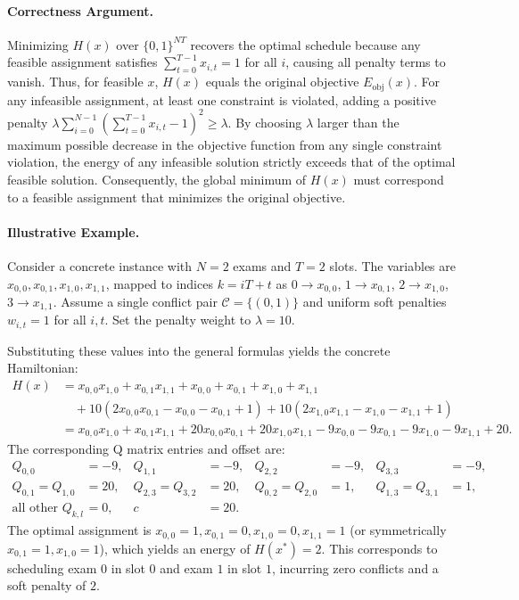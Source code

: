 \documentclass[12pt]{article}
\begin{document}
\paragraph{Correctness Argument.}
Minimizing $H(x)$ over $\{0,1\}^{NT}$ recovers the optimal schedule because any feasible assignment satisfies $\sum_{t=0}^{T-1} x_{i,t} = 1$ for all $i$, causing all penalty terms to vanish. Thus, for feasible $x$, $H(x)$ equals the original objective $E_{\text{obj}}(x)$. For any infeasible assignment, at least one constraint is violated, adding a positive penalty $\lambda \sum_{i=0}^{N-1} (\sum_{t=0}^{T-1} x_{i,t} - 1)^2 \ge \lambda$. By choosing $\lambda$ larger than the maximum possible decrease in the objective function from any single constraint violation, the energy of any infeasible solution strictly exceeds that of the optimal feasible solution. Consequently, the global minimum of $H(x)$ must correspond to a feasible assignment that minimizes the original objective.

\paragraph{Illustrative Example.}
Consider a concrete instance with $N=2$ exams and $T=2$ slots. The variables are $x_{0,0}, x_{0,1}, x_{1,0}, x_{1,1}$, mapped to indices $k = i T + t$ as $0 \to x_{0,0}$, $1 \to x_{0,1}$, $2 \to x_{1,0}$, $3 \to x_{1,1}$. Assume a single conflict pair $\mathcal{C} = \{(0,1)\}$ and uniform soft penalties $w_{i,t} = 1$ for all $i,t$. Set the penalty weight to $\lambda = 10$.

Substituting these values into the general formulas yields the concrete Hamiltonian:
\begin{align}
H(x) &= x_{0,0}x_{1,0} + x_{0,1}x_{1,1} + x_{0,0} + x_{0,1} + x_{1,0} + x_{1,1} \\
&\quad + 10 \left( 2x_{0,0}x_{0,1} - x_{0,0} - x_{0,1} + 1 \right) + 10 \left( 2x_{1,0}x_{1,1} - x_{1,0} - x_{1,1} + 1 \right) \\
&= x_{0,0}x_{1,0} + x_{0,1}x_{1,1} + 20x_{0,0}x_{0,1} + 20x_{1,0}x_{1,1} - 9x_{0,0} - 9x_{0,1} - 9x_{1,0} - 9x_{1,1} + 20.
\end{align}
The corresponding Q matrix entries and offset are:
\begin{align}
Q_{0,0} &= -9, & Q_{1,1} &= -9, & Q_{2,2} &= -9, & Q_{3,3} &= -9, \\
Q_{0,1} = Q_{1,0} &= 20, & Q_{2,3} = Q_{3,2} &= 20, & Q_{0,2} = Q_{2,0} &= 1, & Q_{1,3} = Q_{3,1} &= 1, \\
\text{all other } Q_{k,l} &= 0, & c &= 20.
\end{align}
The optimal assignment is $x_{0,0}=1, x_{0,1}=0, x_{1,0}=0, x_{1,1}=1$ (or symmetrically $x_{0,1}=1, x_{1,0}=1$), which yields an energy of $H(x^*) = 2$. This corresponds to scheduling exam $0$ in slot $0$ and exam $1$ in slot $1$, incurring zero conflicts and a soft penalty of $2$.
\end{document}
